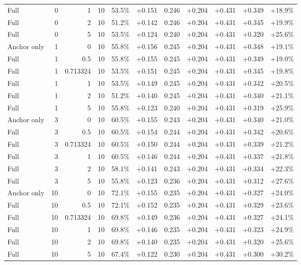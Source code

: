\begin{table}[htbp]
\begin{tabular}{lrrrccccccc}
Full & 0 & 1 & 10 & 53.5\% & +0.151 & 0.246 & +0.204 & +0.431 & +0.349 & +18.9\% \\
Full & 0 & 2 & 10 & 51.2\% & +0.142 & 0.246 & +0.204 & +0.431 & +0.345 & +19.9\% \\
Full & 0 & 5 & 10 & 53.5\% & +0.124 & 0.240 & +0.204 & +0.431 & +0.320 & +25.6\% \\
Anchor only & 1 & 0 & 10 & 55.8\% & +0.156 & 0.245 & +0.204 & +0.431 & +0.348 & +19.1\% \\
Full & 1 & 0.5 & 10 & 55.8\% & +0.155 & 0.245 & +0.204 & +0.431 & +0.349 & +19.0\% \\
Full & 1 & 0.713324 & 10 & 53.5\% & +0.151 & 0.245 & +0.204 & +0.431 & +0.345 & +19.8\% \\
Full & 1 & 1 & 10 & 53.5\% & +0.149 & 0.245 & +0.204 & +0.431 & +0.342 & +20.5\% \\
Full & 1 & 2 & 10 & 51.2\% & +0.140 & 0.245 & +0.204 & +0.431 & +0.340 & +21.1\% \\
Full & 1 & 5 & 10 & 55.8\% & +0.123 & 0.240 & +0.204 & +0.431 & +0.319 & +25.9\% \\
Anchor only & 3 & 0 & 10 & 60.5\% & +0.155 & 0.243 & +0.204 & +0.431 & +0.340 & +21.0\% \\
Full & 3 & 0.5 & 10 & 60.5\% & +0.154 & 0.244 & +0.204 & +0.431 & +0.342 & +20.6\% \\
Full & 3 & 0.713324 & 10 & 60.5\% & +0.150 & 0.244 & +0.204 & +0.431 & +0.339 & +21.2\% \\
Full & 3 & 1 & 10 & 60.5\% & +0.146 & 0.244 & +0.204 & +0.431 & +0.337 & +21.8\% \\
Full & 3 & 2 & 10 & 58.1\% & +0.141 & 0.243 & +0.204 & +0.431 & +0.334 & +22.3\% \\
Full & 3 & 5 & 10 & 55.8\% & +0.123 & 0.236 & +0.204 & +0.431 & +0.312 & +27.6\% \\
Anchor only & 10 & 0 & 10 & 72.1\% & +0.155 & 0.235 & +0.204 & +0.431 & +0.327 & +24.0\% \\
Full & 10 & 0.5 & 10 & 72.1\% & +0.152 & 0.235 & +0.204 & +0.431 & +0.329 & +23.6\% \\
Full & 10 & 0.713324 & 10 & 69.8\% & +0.149 & 0.236 & +0.204 & +0.431 & +0.327 & +24.1\% \\
Full & 10 & 1 & 10 & 69.8\% & +0.146 & 0.235 & +0.204 & +0.431 & +0.323 & +24.9\% \\
Full & 10 & 2 & 10 & 69.8\% & +0.140 & 0.235 & +0.204 & +0.431 & +0.320 & +25.6\% \\
Full & 10 & 5 & 10 & 67.4\% & +0.122 & 0.230 & +0.204 & +0.431 & +0.300 & +30.2\% \\

\end{tabular}
\end{table}

